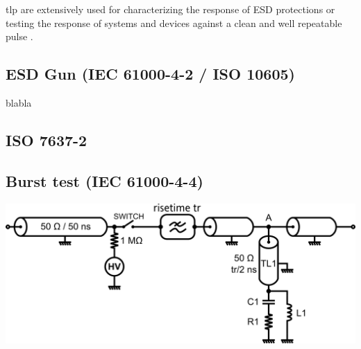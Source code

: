 \gls{tlp} are extensively used for characterizing the response of ESD protections \cite{TLP, TLPforESDProtectionCz}
or testing the response of systems and devices against a clean and well repeatable pulse \cite{TLPthroubleshooting, LacrampeTransientImmunity}.

\subsection{ESD Gun (IEC 61000-4-2 / ISO 10605)}
blabla

\subsection{ISO 7637-2}

\subsection{Burst test (IEC 61000-4-4)}

\includegraphics[width=\textwidth,height=\textheight,keepaspectratio]{src/2/figures/tlp_iec.png}
